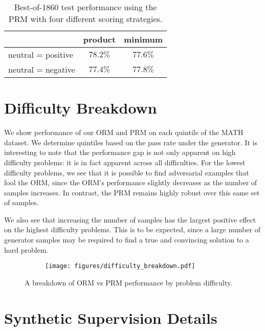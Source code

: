 \documentclass{article}
\begin{document}
\begin{table}[!h]
\centering
\begin{tabular}{l*{2}{c}} 
 \hline
  & product & minimum \\ 
 \hline
 neutral = positive & $78.2\%$ & $77.6\%$ \\ 
 neutral = negative & $77.4\%$ & $77.8\%$ \\ 
 \hline
\end{tabular}
\caption{Best-of-1860 test performance using the PRM with four different scoring strategies.}
\label{table:scoring}
\end{table}

\newpage

\section{Difficulty Breakdown} \label{appendix:difficulty_breakdown}

We show performance of our ORM and PRM on each quintile of the MATH dataset. We determine quintiles based on the pass rate under the generator. It is interesting to note that the performance gap is not only apparent on high difficulty problems: it is in fact apparent across all difficulties. For the lowest difficulty problems, we see that it is possible to find adversarial examples that fool the ORM, since the ORM's performance slightly decreases as the number of samples increases. In contrast, the PRM remains highly robust over this same set of samples.

We also see that increasing the number of samples has the largest positive effect on the highest difficulty problems. This is to be expected, since a large number of generator samples may be required to find a true and convincing solution to a hard problem.

\begin{figure}[!h]
\centering
\begin{subfigure}{\textwidth}
\texttt{[image: figures/difficulty\_breakdown.pdf]}
\end{subfigure}
\caption{A breakdown of ORM vs PRM performance by problem difficulty.}
\label{figure:difficulty}
\end{figure}

\newpage

\section{Synthetic Supervision Details} \label{appendix:prm_synthetic}
\end{document}
